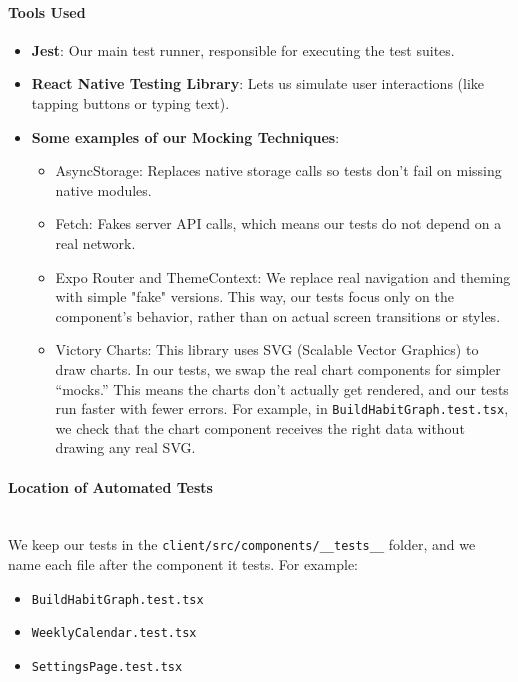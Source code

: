 \paragraph{Tools Used} \begin{itemize} \item \textbf{Jest}: Our main test runner, responsible for executing the test suites. \item \textbf{React Native Testing Library}: Lets us simulate user interactions (like tapping buttons or typing text). \item \textbf{Some examples of our Mocking Techniques}: \begin{itemize} \item{AsyncStorage}: Replaces native storage calls so tests don’t fail on missing native modules. \item{Fetch}: Fakes server API calls, which means our tests do not depend on a real network. \item {Expo Router and ThemeContext:}
We replace real navigation and theming with simple "fake" versions. This way, our tests focus only on the component’s behavior, rather than on actual screen transitions or styles. \item {Victory Charts}: This library uses SVG (Scalable Vector Graphics) to draw charts. In our tests, we swap the real chart components for simpler “mocks.” This means the charts don’t actually get rendered, and our tests run faster with fewer errors. For example, in \texttt{BuildHabitGraph.test.tsx}, we check that the chart component receives the right data without drawing any real SVG. \end{itemize} \end{itemize}


\paragraph{Location of Automated Tests}\mbox{}\\

We keep our tests in the \texttt{client/src/components/\_\_tests\_\_} folder, and we name each file after the component it tests. For example:

\begin{itemize} \item \texttt{BuildHabitGraph.test.tsx}\item \texttt{WeeklyCalendar.test.tsx} \item \texttt{SettingsPage.test.tsx} \end{itemize}

